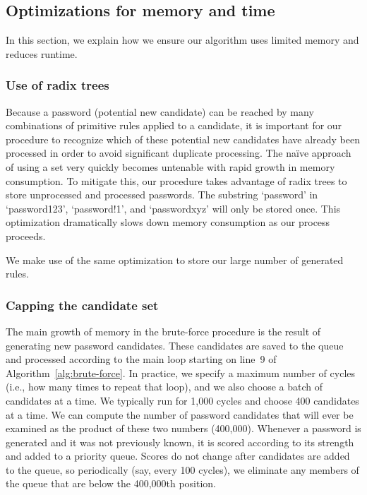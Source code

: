 \documentclass{article}
\begin{document}
\subsection{Optimizations for memory and time}

In this section, we explain how we ensure our algorithm uses limited memory
and reduces runtime.

\subsubsection{Use of radix trees}

Because a password (potential new candidate) can be reached by many
combinations of primitive rules applied to a candidate, it is important for our
procedure to recognize which of these potential new candidates have already been
processed in order to avoid significant duplicate processing. The naïve approach
of using a set very quickly becomes untenable with rapid growth in memory
consumption. To mitigate this, our procedure takes advantage of radix trees to
store unprocessed and processed passwords. The substring `password' in
`password123', `password!1', and `passwordxyz' will only be stored once. This
optimization dramatically slows down memory consumption as our process proceeds.

We make use of the same optimization to store our large number of generated
rules.

\subsubsection{Capping the candidate set}

The main growth of memory in the brute-force procedure is the result of
generating new password candidates. These candidates are saved to the queue and
processed according to the main loop starting on line~9 of
Algorithm~\ref{alg:brute-force}. In practice, we specify a maximum number of
cycles (i.e., how many times to repeat that loop), and we also choose a batch
of candidates at a time. We typically run for 1,000 cycles and choose 400
candidates at a time. We can compute the number of password candidates that
will ever be examined as the product of these two numbers (400,000). Whenever a
password is generated and it was not previously known, it is scored according
to its strength and added to a priority queue. Scores do not change after
candidates are added to the queue, so periodically (say, every 100 cycles), we
eliminate any members of the queue that are below the 400,000th position.
\end{document}
